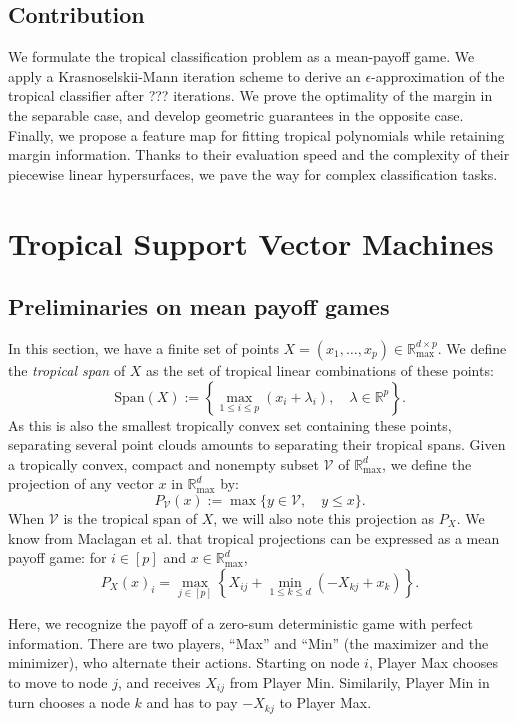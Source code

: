 \documentclass[oneside,english,a4paper]{amsart}
\numberwithin{equation}{section}
\numberwithin{figure}{section}
\theoremstyle{plain}
\theoremstyle{definition}
\theoremstyle{plain}
\theoremstyle{remark}
\theoremstyle{plain}
\theoremstyle{definition}
\theoremstyle{definition}
\begin{document}
\subsection*{Contribution}

We formulate the tropical classification problem as a mean-payoff game. We apply a Krasnoselskii-Mann iteration scheme to derive an $\epsilon$-approximation of the tropical classifier after ??? iterations. We prove the optimality of the margin in the separable case, and develop geometric guarantees in the opposite case. Finally, we propose a feature map for fitting tropical polynomials while retaining margin information. Thanks to their evaluation speed and the complexity of their piecewise linear hypersurfaces, we pave the way for complex classification tasks.

\newpage
\section{Tropical Support Vector Machines}\label{Sec2}

\subsection{Preliminaries on mean payoff games}

In this section, we have a finite set of points $X=(x_{1},\ldots,x_{p})\in\mathbb{R}_{\text{max}}^{d\times p}$.
We define the \emph{tropical span} of $X$ as the set of tropical
linear combinations of these points:
\[
\text{Span}(X):=\left\{\max_{1\le i\le p}(x_{i}+\lambda_{i}),\quad\lambda\in\mathbb{R}^{p}\right\}.
\]
As this is also the smallest tropically convex set containing these
points, separating several point clouds amounts to separating their
tropical spans. Given a tropically convex, compact and nonempty subset $\mathcal{V}$
of $\mathbb{R}_{\max}^{d}$, we define the projection of any vector
$x$ in $\mathbb{R}_{\max}^{d}$ by:
\[
P_{\mathcal{V}}(x):=\max\{y\in \mathcal{V},\quad y\le x\}.
\]
When $\mathcal{V}$ is the tropical span of $X$, we will also note
this projection as $P_{X}$. We know from Maclagan et al. \cite{Maclagan2015} that tropical projections
can be expressed as a mean payoff game: for $i\in[p]$ and $x\in\mathbb{R}_{\max}^{d}$,
\begin{equation}
P_{X}(x)_{i}=\max_{j\in[p]}\left\{X_{ij}+\min_{1\le k \le d}(-X_{kj}+x_{k})\right\}.\label{eq:projector}
\end{equation}

Here, we recognize the payoff of a zero-sum deterministic game with perfect
information. There are two players, ``Max'' and ``Min'' (the maximizer
and the minimizer), who alternate their actions. Starting on node
$i$, Player Max chooses to move to node $j$, and receives $X_{ij}$
from Player Min. Similarily, Player Min in turn chooses a node $k$
and has to pay $-X_{kj}$ to Player Max.
\end{document}
